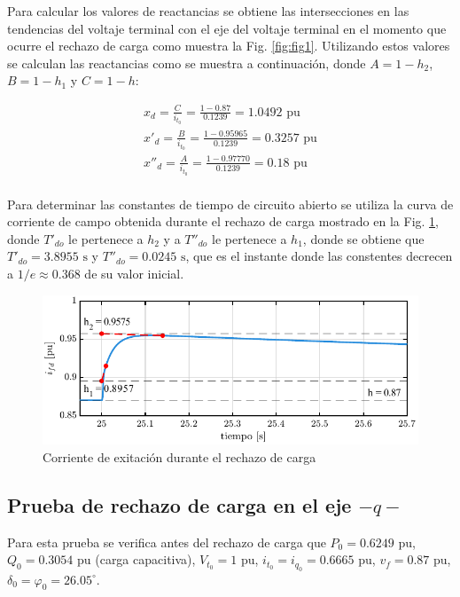 \documentclass[conference]{IEEEtran}
\begin{document}
Para calcular los valores de reactancias se obtiene las intersecciones en las tendencias del
voltaje terminal con el eje del voltaje terminal en el momento que ocurre el rechazo de carga
como muestra la Fig. \ref{fig:fig1}. Utilizando estos valores se calculan las reactancias como
se muestra a continuación, donde $A=1-h_2$, $B=1-h_1$ y $C=1-h$:

\begin{gather*}
x_d = \frac{C}{i_{t_0}} = \frac{1 - 0.87}{0.1239} = 1.0492\text{ pu} \\
x'_{d} = \frac{B}{i_{t_0}} = \frac{1 - 0.95965}{0.1239} = 0.3257\text{ pu}\\
x''_{d} = \frac{A}{i_{t_0}} = \frac{1 - 0.97770}{0.1239} = 0.18\text{ pu}\\
\end{gather*}

Para determinar las constantes de tiempo de circuito abierto se utiliza la curva de corriente de campo
obtenida durante el rechazo de carga mostrado en la Fig. \ref{fig:fig2}, donde $T'_{do}$ le pertenece a $h_2$ y a $T''_{do}$ le pertenece a $h_1$,
donde se obtiene que $T'_{do} = 3.8955\text{ s}$ y $T''_{do} = 0.0245\text{ s}$, que es el instante donde las constentes decrecen a $1/e \approx 0.368$ de su valor inicial.\cite{IEEE115,IEEE1110}

\begin{figure}[H]
    \centering
    \includegraphics[width=\linewidth]{Fig/fig2.pdf}
    \caption{Corriente de exitación durante el rechazo de carga}
    \label{fig:fig2}
\end{figure}

\subsection{Prueba de rechazo de carga en el eje $-q-$}
Para esta prueba se verifica antes del rechazo de carga que $P_0 = 0.6249\text{ pu}$, $Q_0 = 0.3054\text{ pu}$ (carga
capacitiva), $V_{t_0} = 1\text{ pu}$, $i_{t_0} = i_{q_0} = 0.6665\text{ pu}$, $v_f = 0.87\text{ pu}$, $\delta_0 = \varphi_0 = 26.05^{\circ}$.
\end{document}
